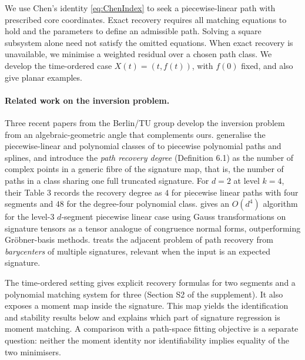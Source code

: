 \documentclass[11pt,english]{article}
\theoremstyle{definition}
\theoremstyle{remark}
\begin{document}
We use Chen's identity \eqref{eq:ChenIndex} to seek a piecewise-linear
path with prescribed core coordinates. Exact recovery requires all
matching equations to hold and the parameters to define an admissible
path. Solving a square subsystem alone need not satisfy the omitted
equations. When exact recovery is unavailable, we minimise a weighted
residual over a chosen path class. We develop the time-ordered case
$X(t)=(t,f(t))$, with $f(0)$ fixed, and also give planar examples.

\paragraph{Related work on the inversion problem.}
Three recent papers from the Berlin/TU group develop the inversion
problem from an algebraic-geometric angle that complements ours. \cite{splines}
generalise the piecewise-linear and polynomial classes of \cite{varieties}
to piecewise polynomial paths and splines, and introduce the \emph{path
recovery degree} (Definition 6.1) as the number of complex points
in a generic fibre of the signature map, that is, the number of paths
in a class sharing one full truncated signature. For $d=2$ at level
$k=4$, their Table 3 records the
recovery degree as $4$ for piecewise linear paths with four segments
and $48$ for the degree-four polynomial class. \cite{tensorlearning}
gives an $O(d^{4})$ algorithm for the level-3 $d$-segment piecewise
linear case using Gauss transformations on signature tensors as a
tensor analogue of congruence normal forms, outperforming Gröbner-basis
methods. \cite{barycenters} treats the adjacent problem of path recovery
from \emph{barycenters} of multiple signatures, relevant when the
input is an expected signature.


The time-ordered setting gives explicit recovery formulas for two
segments and a polynomial matching system for three (Section S2 of
the supplement). It also exposes a moment map inside the
signature. This map yields the identification and stability results
below and explains which part of signature regression is moment
matching. A comparison with a path-space fitting objective is a
separate question: neither the moment identity nor identifiability
implies equality of the two minimisers.
\end{document}
